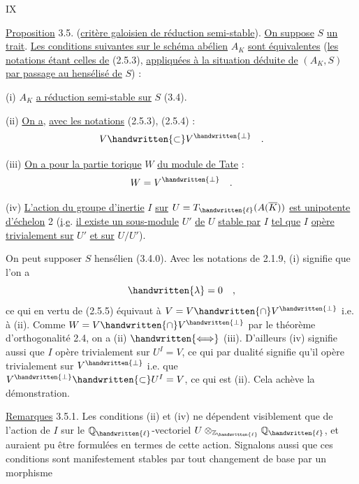\hfill IX

\uline{Proposition} 3.5. (\uline{critère galoisien de réduction semi-stable}). \uline{On suppose} $S$ \uline{un trait}. \uline{Les conditions suivantes sur le schéma abélien} $A_K$ \uline{sont équivalentes} (\uline{les notations étant celles de} (2.5.3), \uline{appliquées à la situation déduite de} $(A_K,S)$ \uline{par passage au hensélisé de} $S$) :

(i) $A_K$ \uline{a réduction semi-stable sur} $S$ (3.4).

(ii) \uline{On a}, \uline{avec les notations} (2.5.3), (2.5.4) :
\[
V\handwritten{\subset}V^{\handwritten{\perp}}\quad .
\]

(iii) \uline{On a pour la partie torique} $W$ \uline{du module de Tate} :
\[
W=V^{\handwritten{\perp}}\quad .
\]

(iv) \uline{L'action du groupe d'inertie} $I$ \uline{sur} $U=T_{\handwritten{\ell}}(A(\overline{K}))$ \uline{est unipotente d'échelon} 2 (\uline{i}.\uline{e}. \uline{il existe un sous-module} $U'$ \uline{de} $U$ \uline{stable par} $I$ \uline{tel que} $I$ \uline{opère trivialement sur} $U'$ \uline{et sur} $U/U'$).

On peut supposer $S$ hensélien (3.4.0). Avec les notations de 2.1.9, (i) signifie que l'on a
\[
\handwritten{\lambda}=0\quad ,
\]
ce qui en vertu de (2.5.5) équivaut à $V=V\handwritten{\cap}V^{\handwritten{\perp}}$ i.e. à (ii). Comme $W=V\handwritten{\cap}V^{\handwritten{\perp}}$ par le théorème d'orthogonalité 2.4, on a (ii) $\handwritten{\Longleftrightarrow}$ (iii). D'ailleurs (iv) signifie aussi que $I$ opère trivialement sur $U^{I}=V$, ce qui par dualité signifie qu'il opère trivialement sur $V^{\handwritten{\perp}}$ i.e. que $V^{\handwritten{\perp}}\handwritten{\subset} U^{I}=V$, ce qui est (ii). Cela achève la démonstration.

\uline{Remarques} 3.5.1. Les conditions (ii) et (iv) ne dépendent visiblement que de l'action de $I$ sur le $\mathbb{Q}_{\handwritten{\ell}}$-vectoriel $U\otimes_{\mathbb{Z}_{\handwritten{\ell}}}\mathbb{Q}_{\handwritten{\ell}}$, et auraient pu être formulées en termes de cette action. Signalons aussi que ces conditions sont manifestement stables par tout changement de base par un morphisme

